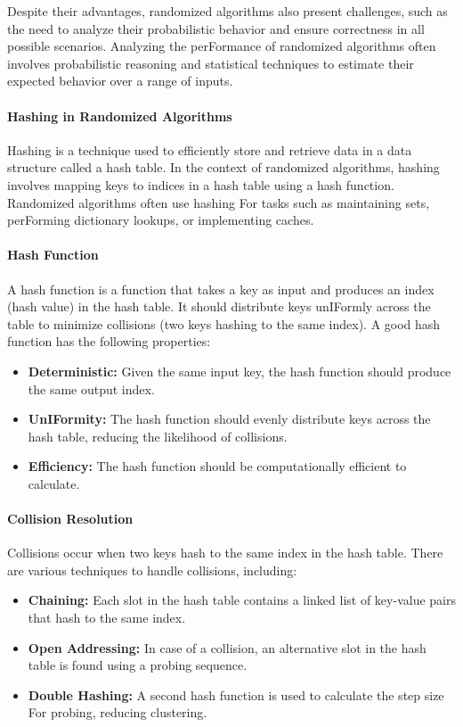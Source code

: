 \documentclass[12pt]{book} %
\begin{document}
Despite their advantages, randomized algorithms also present challenges, such as the need to analyze their probabilistic behavior and ensure correctness in all possible scenarios. Analyzing the perFormance of randomized algorithms often involves probabilistic reasoning and statistical techniques to estimate their expected behavior over a range of inputs.
\FloatBarrier
\paragraph{Hashing in Randomized Algorithms}

Hashing is a technique used to efficiently store and retrieve data in a data structure called a hash table. In the context of randomized algorithms, hashing involves mapping keys to indices in a hash table using a hash function. Randomized algorithms often use hashing For tasks such as maintaining sets, perForming dictionary lookups, or implementing caches.

\paragraph{Hash Function}

A hash function is a function that takes a key as input and produces an index (hash value) in the hash table. It should distribute keys unIFormly across the table to minimize collisions (two keys hashing to the same index). A good hash function has the following properties:

\begin{itemize}
    \item \textbf{Deterministic:} Given the same input key, the hash function should produce the same output index.
    \item \textbf{UnIFormity:} The hash function should evenly distribute keys across the hash table, reducing the likelihood of collisions.
    \item \textbf{Efficiency:} The hash function should be computationally efficient to calculate.
\end{itemize}

\paragraph{Collision Resolution}

Collisions occur when two keys hash to the same index in the hash table. There are various techniques to handle collisions, including:

\begin{itemize}
    \item \textbf{Chaining:} Each slot in the hash table contains a linked list of key-value pairs that hash to the same index.
    \item \textbf{Open Addressing:} In case of a collision, an alternative slot in the hash table is found using a probing sequence.
    \item \textbf{Double Hashing:} A second hash function is used to calculate the step size For probing, reducing clustering.
\end{itemize}
\end{document}
